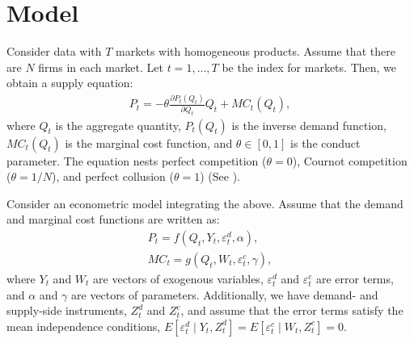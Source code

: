 \documentclass[11pt, a4paper]{article}
\begin{document}
\section{Model}
Consider data with $T$ markets with homogeneous products.
Assume that there are $N$ firms in each market.
Let $t = 1,\ldots, T$ be the index for markets.
Then, we obtain a supply equation:
\begin{align}
     P_{t} = -\theta\frac{\partial P_{t}(Q_{t})}{\partial Q_{t}}Q_{t} + MC_{t}(Q_{t}),\label{eq:supply_equation}
\end{align}
where $Q_{t}$ is the aggregate quantity, $P_{t}(Q_{t})$ is the inverse demand function, $MC_{t}(Q_{t})$ is the marginal cost function, and $\theta\in[0,1]$ is  the conduct parameter. 
The equation nests perfect competition ($\theta=0$), Cournot competition ($\theta=1/N$), and perfect collusion ($\theta=1$) (See \cite{bresnahan1982oligopoly}). 

Consider an econometric model integrating the above.
Assume that the demand and marginal cost functions are written as: 
\begin{align}
    P_{t} = f(Q_{t}, Y_{t}, \varepsilon^{d}_{t}, \alpha), \label{eq:demand}\\
    MC_{t} = g(Q_{t}, W_{t}, \varepsilon^{c}_{t}, \gamma),\label{eq:marginal_cost}
\end{align}
where $Y_{t}$ and $W_{t}$ are vectors of exogenous variables, $\varepsilon^{d}_{t}$ and $\varepsilon^{c}_{t}$ are error terms, and $\alpha$ and $\gamma$ are vectors of parameters.
Additionally, we have demand- and supply-side instruments, $Z^{d}_{t}$ and $Z^{c}_{t}$, and assume that the error terms satisfy the mean independence conditions, $E[\varepsilon^{d}_{t}\mid Y_{t}, Z^{d}_{t}] = E[\varepsilon^{c}_{t} \mid W_{t}, Z^{c}_{t}] =0$.
\end{document}
